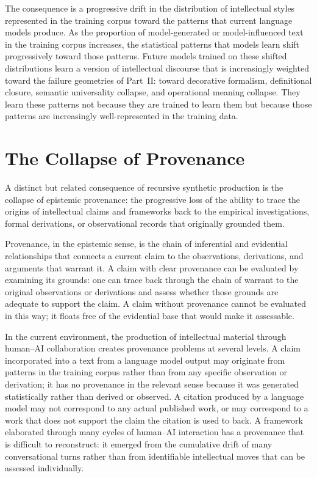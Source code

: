 \documentclass[12pt, openright, twoside]{book}
\begin{document}
The consequence is a progressive drift in the
distribution of intellectual styles represented
in the training corpus toward the patterns that
current language models produce. As the proportion
of model-generated or model-influenced text in
the training corpus increases, the statistical
patterns that models learn shift progressively
toward those patterns. Future models trained on
these shifted distributions learn a version of
intellectual discourse that is increasingly
weighted toward the failure geometries of Part~II:
toward decorative formalism, definitional closure,
semantic universality collapse, and operational
meaning collapse. They learn these patterns not
because they are trained to learn them but because
those patterns are increasingly well-represented
in the training data.

\section{The Collapse of Provenance}

A distinct but related consequence of recursive
synthetic production is the collapse of epistemic
provenance: the progressive loss of the ability
to trace the origins of intellectual claims and
frameworks back to the empirical investigations,
formal derivations, or observational records
that originally grounded them.

Provenance, in the epistemic sense, is the
chain of inferential and evidential relationships
that connects a current claim to the observations,
derivations, and arguments that warrant it.
A claim with clear provenance can be evaluated
by examining its grounds: one can trace back
through the chain of warrant to the original
observations or derivations and assess whether
those grounds are adequate to support the claim.
A claim without provenance cannot be evaluated
in this way; it floats free of the evidential
base that would make it assessable.

In the current environment, the production of
intellectual material through human--AI collaboration
creates provenance problems at several levels.
A claim incorporated into a text from a language
model output may originate from patterns in the
training corpus rather than from any specific
observation or derivation; it has no provenance
in the relevant sense because it was generated
statistically rather than derived or observed.
A citation produced by a language model may
not correspond to any actual published work,
or may correspond to a work that does not support
the claim the citation is used to back. A framework
elaborated through many cycles of human--AI
interaction has a provenance that is difficult
to reconstruct: it emerged from the cumulative
drift of many conversational turns rather than
from identifiable intellectual moves that can
be assessed individually.
\end{document}
